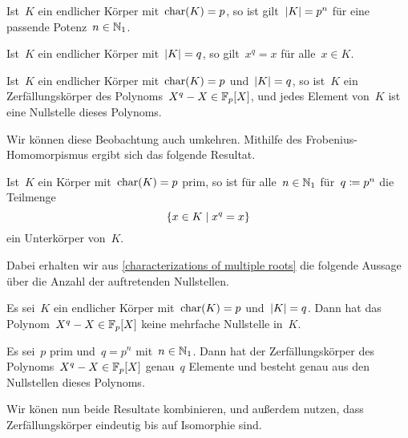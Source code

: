 \begin{proposition}
  Ist~$K$ ein endlicher Körper mit~$\operatorname{char}(K) = p$, so ist gilt~$\lvert K\rvert = p^n$ für eine passende Potenz~$n \in \mathbb{N}_1$.
\end{proposition}

\begin{lemma}
  \label{trick lemma for finite fields}
  Ist~$K$ ein endlicher Körper mit~$\lvert K\rvert = q$, so gilt~$x^q = x$ für alle~$x \in K$.
\end{lemma}

\begin{proposition}
  Ist~$K$ ein endlicher Körper mit~$\operatorname{char}(K) = p$ und~$\lvert K\rvert = q$, so ist~$K$ ein Zerfällungskörper des Polynoms~$X^q - X \in \mathbb{F}_p[X]$, und jedes Element von~$K$ ist eine Nullstelle dieses Polynoms.
\end{proposition}

Wir können diese Beobachtung auch umkehren.
Mithilfe des Frobenius-Homomorpismus ergibt sich das folgende Resultat.

\begin{lemma}
  Ist~$K$ ein Körper mit~$\operatorname{char}(K) = p$ prim, so ist für alle~$n \in \mathbb{N}_1$ für~$q \coloneqq p^n$ die Teilmenge
  \[
    \{
      x \in K
    \suchthat
      x^q = x
    \}
  \]
  ein Unterkörper von~$K$.
\end{lemma}

Dabei erhalten wir aus \cref{characterizations of multiple roots} die folgende Aussage über die Anzahl der auftretenden Nullstellen.

\begin{lemma}
  Es sei~$K$ ein endlicher Körper mit~$\operatorname{char}(K) = p$ und~$\lvert K\rvert = q$.
  Dann hat das Polynom~$X^q - X \in \mathbb{F}_p[X]$ keine mehrfache Nullstelle in~$K$.
\end{lemma}

\begin{proposition}
  Es sei~$p$ prim und~$q = p^n$ mit~$n \in \mathbb{N}_1$.
  Dann hat der Zerfällungskörper des Polynoms~$X^q - X \in \mathbb{F}_p[X]$ genau~$q$ Elemente und besteht genau aus den Nullstellen dieses Polynoms.
\end{proposition}

Wir könen nun beide Resultate kombinieren, und außerdem nutzen, dass Zerfällungskörper eindeutig bis auf Isomorphie sind.

